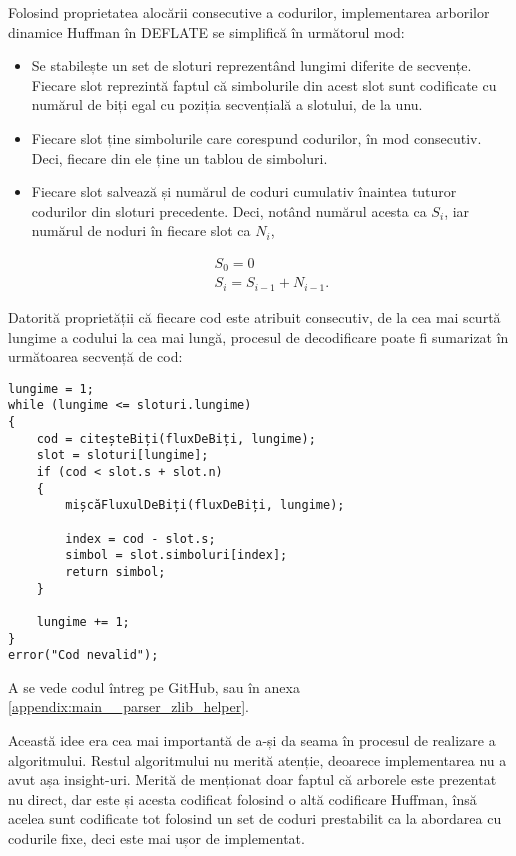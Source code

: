 \documentclass[a4paper,12pt]{report}
\begin{document}
Folosind proprietatea alocării consecutive a codurilor,
implementarea arborilor dinamice Huffman în DEFLATE se simplifică în următorul mod:
\begin{itemize}
    \item 
        Se stabilește un set de sloturi reprezentând lungimi diferite de secvențe.
        Fiecare slot reprezintă faptul că simbolurile din acest slot
        sunt codificate cu numărul de biți egal cu poziția secvențială a slotului, de la unu.
    \item
        Fiecare slot ține simbolurile care corespund codurilor, în mod consecutiv.
        Deci, fiecare din ele ține un tablou de simboluri.
    \item
        Fiecare slot salvează și numărul de coduri cumulativ înaintea tuturor codurilor din sloturi precedente.
        Deci, notând numărul acesta ca \( S_i \), iar numărul de noduri în fiecare slot ca \( N_i \),

        \begin{gather*}
            S_0 = 0 \\
            S_i = S_{i - 1} + N_{i - 1}.
        \end{gather*}
\end{itemize}

Datorită proprietății că fiecare cod este atribuit consecutiv,
de la cea mai scurtă lungime a codului la cea mai lungă,
procesul de decodificare poate fi sumarizat în următoarea secvență de cod:

\begin{verbatim}
lungime = 1;
while (lungime <= sloturi.lungime)
{
    cod = citeșteBiți(fluxDeBiți, lungime);
    slot = sloturi[lungime];
    if (cod < slot.s + slot.n)
    {
        mișcăFluxulDeBiți(fluxDeBiți, lungime);

        index = cod - slot.s;
        simbol = slot.simboluri[index];
        return simbol;
    }

    lungime += 1;
}
error("Cod nevalid");
\end{verbatim}

A se vede codul întreg pe GitHub, sau în anexa \ref{appendix:main__parser_zlib_helper}.

Această idee era cea mai importantă de a-și da seama în procesul de realizare a algoritmului.
Restul algoritmului nu merită atenție, deoarece implementarea nu a avut așa insight-uri.
Merită de menționat doar faptul că arborele este prezentat nu direct,
dar este și acesta codificat folosind o altă codificare Huffman,
însă acelea sunt codificate tot folosind un set de coduri prestabilit
ca la abordarea cu codurile fixe, deci este mai ușor de implementat.
\end{document}
